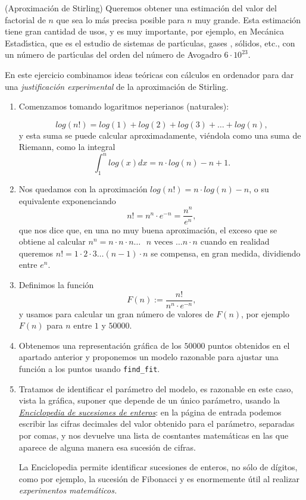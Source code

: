 \begin{ejer} 

({\sc Aproximaci\'on de Stirling}) Queremos obtener una
estimaci\'on del valor del factorial de $n$ que sea lo m\'as precisa posible
para $n$ muy grande. Esta estimaci\'on tiene gran cantidad de usos, y es muy
importante, por ejemplo, en Mec\'anica Estad\'{\i}stica,  que es el estudio de
sistemas de part\'{\i}culas, gases , s\'olidos, etc., con un n\'umero de
part\'{\i}culas del orden del n\'umero de Avogadro  $6\cdot 10^23.$
 
 En este ejercicio combinamos ideas te\'oricas con c\'alculos en ordenador para
dar una {\itshape justificaci\'on experimental} de la aproximaci\'on de
Stirling.

\begin{enumerate}
 \item Comenzamos tomando logaritmos neperianos (naturales):
 
 \[log(n!)=log(1)+log(2)+log(3)+\dots+log(n),\]
 \noindent y esta suma se puede calcular aproximadamente, vi\'endola como una
suma de Riemann, como la  integral 
\[\int_1^n log(x)dx=n\cdot log(n)-n+1.\]

\item Nos quedamos con la aproximaci\'on $log(n!)=n\cdot log(n)-n$, o su
equivalente exponenciando
\[n!=n^n\cdot e^{-n}=\frac{n^n}{e^n},\]
\noindent que nos dice que, en una no muy buena aproximaci\'on, el exceso que
se obtiene al calcular $n^n=n\cdot n\cdot n\dots \text{ $n$ veces }\dots n\cdot
n$ cuando en realidad queremos $n!=1\cdot 2\cdot 3\dots (n-1)\cdot n$ se
compensa, en gran medida,  dividiendo entre $e^n$.

\item Definimos la funci\'on 
\[F(n):=\frac{n!}{n^n\cdot e^{-n}},\]
\noindent y usamos {\sage} para calcular un gran n\'umero de valores de $F(n)$,
por ejemplo $F(n)$ para $n$ entre $1$ y $50000$.

\item Obtenemos una representaci\'on gr\'afica de los $50000$ puntos obtenidos
en el apartado anterior y proponemos un modelo razonable para ajustar una
funci\'on a los puntos usando \lstinline|find_fit|.
\label{stirling}
\item Tratamos de identificar el par\'ametro del modelo, es razonable en este
caso, vista la gr\'afica,  suponer que depende de un \'unico par\'ametro, usando
la
\href{https://oeis.org/}{{\itshape  Enciclopedia de sucesiones de enteros}}: en
la p\'agina de entrada podemos escribir las cifras decimales del valor obtenido
para el par\'ametro, separadas por comas, y nos devuelve una lista de
cosntantes matem\'aticas en las que aparece de alguna manera esa sucesi\'on de
cifras. 

La Enciclopedia permite identificar sucesiones  de enteros, no
s\'olo de d\'igitos, como por ejemplo, la sucesi\'on de Fibonacci y es
enormemente \'util al realizar {\itshape experimentos matem\'aticos.}
\end{enumerate}
 \end{ejer}
 
